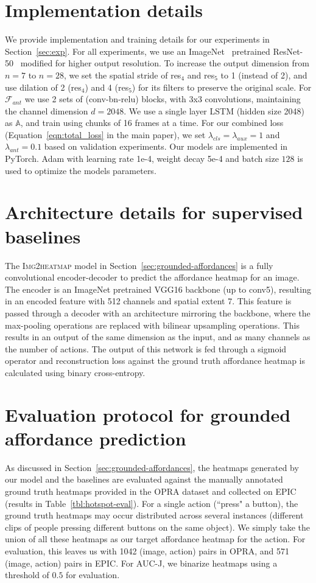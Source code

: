 \documentclass[10pt,twocolumn,letterpaper]{article}
\newcommand{\SC}[1]{{\textsc{#1}}}
\newcommand{\refeqn}[1]{Equation~\ref{#1}}
\newcommand{\reftbl}[1]{Table~\ref{#1}}
\newcommand{\refsec}[1]{Section~\ref{#1}}
\begin{document}
\section{Implementation details} \label{sec:implementation}
We provide implementation and training details for our experiments in  \refsec{sec:exp}. For all experiments, we use an ImageNet~\cite{krizhevsky2012imagenet} pretrained ResNet-50~\cite{he2016deep} modified for higher output resolution. To increase the output dimension from $n = 7 $ to $n = 28$, we set the spatial stride of res$_4$ and res$_5$ to 1 (instead of 2), and use dilation of 2 (res$_4$) and 4 (res$_5$) for its filters to preserve the original scale.  For $\mathcal{F}_{ant}$ we use 2 sets of  (conv-bn-relu) blocks, with 3x3 convolutions, maintaining the channel dimension $d=2048$. We use a single layer LSTM (hidden size 2048) as $\mathbb{A}$, and train using chunks of 16 frames at a time. For our combined loss (\refeqn{eqn:total_loss} in the main paper), we set $\lambda_{cls} = \lambda_{aux} = 1$ and $\lambda_{ant} = 0.1$ based on validation experiments. Our models are implemented in PyTorch. Adam with learning rate 1e-4, weight decay 5e-4 and batch size $128$ is used to optimize the models parameters. 



\section{Architecture details for supervised baselines} \label{sec:img2heatmap}
The \SC{Img2heatmap} model in \refsec{sec:grounded-affordances} is a fully convolutional encoder-decoder to predict the affordance heatmap for an image. The encoder is an ImageNet pretrained VGG16 backbone (up to conv5), resulting in an encoded feature with 512 channels and spatial extent 7. This feature is passed through a decoder with an architecture mirroring the backbone, where the max-pooling operations are replaced with bilinear upsampling operations. This results in an output of the same dimension as the input, and as many channels as the number of actions. The output of this network is fed through a sigmoid operator and reconstruction loss against the ground truth affordance heatmap is calculated using binary cross-entropy.

\section{Evaluation protocol for grounded affordance prediction} \label{sec:evaluation}
As discussed in \refsec{sec:grounded-affordances}, the heatmaps generated by our model and the baselines are evaluated against the manually annotated ground truth heatmaps provided in the OPRA dataset and collected on EPIC (results in \reftbl{tbl:hotspot-eval}). For a single action (\eg ``press" a button), the ground truth heatmaps may occur distributed across several instances (\eg different clips of people pressing different buttons on the same object). We simply take the union of all these heatmaps as our target affordance heatmap for the action. For evaluation, this leaves us with 1042 (image, action) pairs in OPRA, and 571 (image, action) pairs in EPIC. For AUC-J, we binarize heatmaps using a threshold of $0.5$ for evaluation. 
\end{document}
